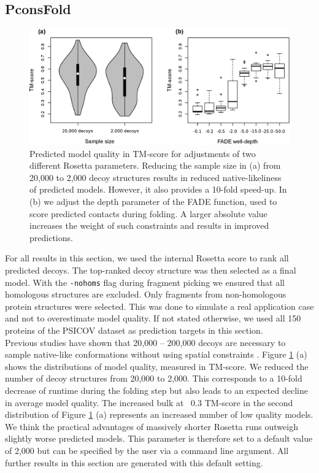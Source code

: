 \documentclass{bioinfo}
\begin{document}
\subsection{PconsFold}
\begin{figure}[!tpb]%
\centerline{\includegraphics[scale=0.7]{figures/rosetta.eps}}
\caption{Predicted model quality in TM-score for adjustments of two different Rosetta parameters. Reducing the sample size in (a) from 20,000 to 2,000 decoy structures results in reduced native-likeliness of predicted models. However, it also provides a 10-fold speed-up. In (b) we adjust the depth parameter of the FADE function, used to score predicted contacts during folding. A larger absolute value increases the weight of such constraints and results in improved predictions.}\label{fig:ros}
\end{figure}
For all results in this section, we used the internal Rosetta score to rank all predicted decoys. The top-ranked decoy structure was then selected as a final model. With the {\tt -nohoms} flag during fragment picking we ensured that all homologous structures are excluded. Only fragments from non-homologous protein structures were selected. This was done to simulate a real application case and not to overestimate model quality. If not stated otherwise, we used all 150 proteins of the PSICOV dataset as prediction targets in this section. \\\indent
Previous studies have shown that 20,000 -- 200,000 decoys are necessary to sample native-like conformations without using spatial constraints \cite[]{rosetta@home, rosetta_folding}. Figure \ref{fig:ros} (a) shows the distributions of model quality, measured in TM-score. We reduced the number of decoy structures from 20,000 to 2,000. This corresponds to a 10-fold decrease of runtime during the folding step but also leads to an expected decline in average model quality. The increased bulk at ~0.3 TM-score in the second distribution of Figure \ref{fig:ros} (a) represents an increased number of low quality models. We think the practical advantages of massively shorter Rosetta runs outweigh slightly worse predicted models. This parameter is therefore set to a default value of 2,000 but can be specified by the user via a command line argument. All further results in this section are generated with this default setting. \\\indent
\end{document}
